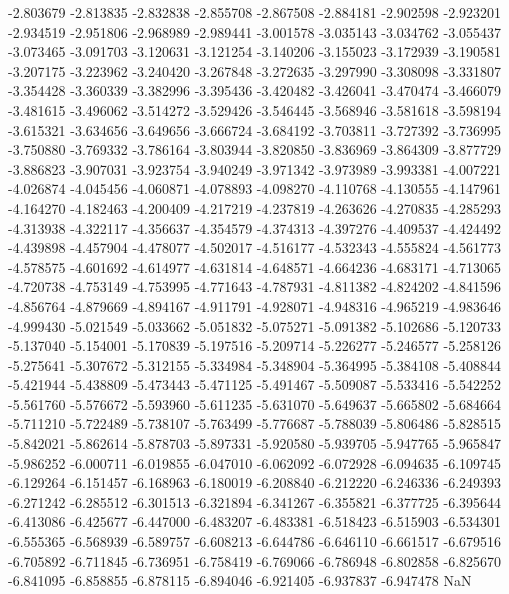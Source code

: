 -2.803679
-2.813835
-2.832838
-2.855708
-2.867508
-2.884181
-2.902598
-2.923201
-2.934519
-2.951806
-2.968989
-2.989441
-3.001578
-3.035143
-3.034762
-3.055437
-3.073465
-3.091703
-3.120631
-3.121254
-3.140206
-3.155023
-3.172939
-3.190581
-3.207175
-3.223962
-3.240420
-3.267848
-3.272635
-3.297990
-3.308098
-3.331807
-3.354428
-3.360339
-3.382996
-3.395436
-3.420482
-3.426041
-3.470474
-3.466079
-3.481615
-3.496062
-3.514272
-3.529426
-3.546445
-3.568946
-3.581618
-3.598194
-3.615321
-3.634656
-3.649656
-3.666724
-3.684192
-3.703811
-3.727392
-3.736995
-3.750880
-3.769332
-3.786164
-3.803944
-3.820850
-3.836969
-3.864309
-3.877729
-3.886823
-3.907031
-3.923754
-3.940249
-3.971342
-3.973989
-3.993381
-4.007221
-4.026874
-4.045456
-4.060871
-4.078893
-4.098270
-4.110768
-4.130555
-4.147961
-4.164270
-4.182463
-4.200409
-4.217219
-4.237819
-4.263626
-4.270835
-4.285293
-4.313938
-4.322117
-4.356637
-4.354579
-4.374313
-4.397276
-4.409537
-4.424492
-4.439898
-4.457904
-4.478077
-4.502017
-4.516177
-4.532343
-4.555824
-4.561773
-4.578575
-4.601692
-4.614977
-4.631814
-4.648571
-4.664236
-4.683171
-4.713065
-4.720738
-4.753149
-4.753995
-4.771643
-4.787931
-4.811382
-4.824202
-4.841596
-4.856764
-4.879669
-4.894167
-4.911791
-4.928071
-4.948316
-4.965219
-4.983646
-4.999430
-5.021549
-5.033662
-5.051832
-5.075271
-5.091382
-5.102686
-5.120733
-5.137040
-5.154001
-5.170839
-5.197516
-5.209714
-5.226277
-5.246577
-5.258126
-5.275641
-5.307672
-5.312155
-5.334984
-5.348904
-5.364995
-5.384108
-5.408844
-5.421944
-5.438809
-5.473443
-5.471125
-5.491467
-5.509087
-5.533416
-5.542252
-5.561760
-5.576672
-5.593960
-5.611235
-5.631070
-5.649637
-5.665802
-5.684664
-5.711210
-5.722489
-5.738107
-5.763499
-5.776687
-5.788039
-5.806486
-5.828515
-5.842021
-5.862614
-5.878703
-5.897331
-5.920580
-5.939705
-5.947765
-5.965847
-5.986252
-6.000711
-6.019855
-6.047010
-6.062092
-6.072928
-6.094635
-6.109745
-6.129264
-6.151457
-6.168963
-6.180019
-6.208840
-6.212220
-6.246336
-6.249393
-6.271242
-6.285512
-6.301513
-6.321894
-6.341267
-6.355821
-6.377725
-6.395644
-6.413086
-6.425677
-6.447000
-6.483207
-6.483381
-6.518423
-6.515903
-6.534301
-6.555365
-6.568939
-6.589757
-6.608213
-6.644786
-6.646110
-6.661517
-6.679516
-6.705892
-6.711845
-6.736951
-6.758419
-6.769066
-6.786948
-6.802858
-6.825670
-6.841095
-6.858855
-6.878115
-6.894046
-6.921405
-6.937837
-6.947478
NaN
